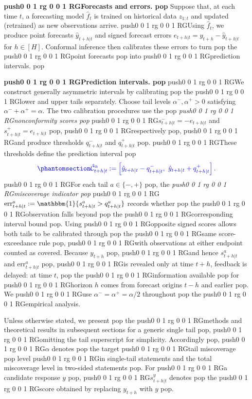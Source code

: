 \documentclass[
  american,
  12pt]{article}
\theoremstyle{plain}
\theoremstyle{plain}
\theoremstyle{remark}
\newcommand{\CPTSadd}[1]{\ifmmode\else\leavevmode\fi\pdfcolorstack 0 push{0 0 1 rg 0 0 1 RG}#1\pdfcolorstack 0 pop}
\begin{document}
\textbf{\CPTSadd{Forecasts and errors.}} Suppose that, at each time \(t\), a
forecasting model \(\hat{f}_t\) is trained on historical data
\(z_{1:t}\) and updated (retrained) as new observations arrive. \CPTSadd{Using
\(\hat{f}_t\), we produce point forecasts \(\hat{y}_{t+h|t}\) and signed
forecast errors \(e_{t+h|t}=y_{t+h}-\hat{y}_{t+h|t}\) for \(h\in[H]\).
Conformal inference then calibrates these errors to turn} the \CPTSadd{point
forecasts} into \CPTSadd{prediction intervals.}

\textbf{\CPTSadd{Prediction intervals.}} \CPTSadd{We construct generally asymmetric
intervals by calibrating} the \CPTSadd{lower and upper tails separately. Choose
tail levels \(\alpha^{-},\alpha^{+}>0\) satisfying
\(\alpha^{-}+\alpha^{+}=\alpha\). The two calibration procedures use the}
\emph{\CPTSadd{nonconformity scores}} \CPTSadd{\(s_{t+h|t}^{-}=-e_{t+h|t}\) and
\(s_{t+h|t}^{+}=e_{t+h|t}\)}, \CPTSadd{respectively}, \CPTSadd{and produce thresholds
\(q_{t+h|t}^{-}\) and \(q_{t+h|t}^{+}\)}. \CPTSadd{These thresholds define the
prediction interval}
\begin{equation}\CPTSadd{\phantomsection\label{eq-two-sided-pi}{
\hat{\mathcal{C}}_{t+h|t}^{\alpha}
:=\left[\hat y_{t+h|t}-q_{t+h|t}^{-},\ \hat y_{t+h|t}+q_{t+h|t}^{+}\right].
}}\end{equation} \CPTSadd{For each tail \(a\in\{-,+\}\)}, the \emph{\CPTSadd{miscoverage
indicator}}
\CPTSadd{\(\mathrm{err}_{t+h|t}^{a}:=\mathbbm{1}\{s_{t+h|t}^{a}>q_{t+h|t}^{a}\}\)
records whether} the \CPTSadd{observation falls beyond} the \CPTSadd{corresponding interval
bound}. Using \CPTSadd{opposite signed scores allows both tails to be calibrated
through} the \CPTSadd{same score-exceedance rule}, \CPTSadd{with observations at either
endpoint counted as covered. Because \(y_{t+h}\)}, \CPTSadd{and hence
\(s_{t+h|t}^{a}\) and \(\mathrm{err}_{t+h|t}^{a}\)}, \CPTSadd{is revealed only at
time \(t+h\), feedback is delayed: at time \(t\),} the \CPTSadd{information
available} for \CPTSadd{horizon \(h\) comes from forecast origins \(t-h\) and
earlier}. We \CPTSadd{use \(\alpha^{-}=\alpha^{+}=\alpha/2\) throughout} the
\CPTSadd{empirical analysis.

Unless otherwise stated, we present} the \CPTSadd{methods and theoretical results
in subsequent sections for a generic single tail}, \CPTSadd{omitting the tail
superscript for simplicity. Accordingly}, \CPTSadd{\(\alpha\) denotes} the target
\CPTSadd{tail miscoverage} level \CPTSadd{in single-tail statements and the total
miscoverage level in two-sided statements}. For \CPTSadd{a candidate response
\(y\)}, \CPTSadd{\(s_{t+h|t}^{y}\) denotes} the \CPTSadd{score obtained by replacing
\(y_{t+h}\) with \(y\)}.
\end{document}
